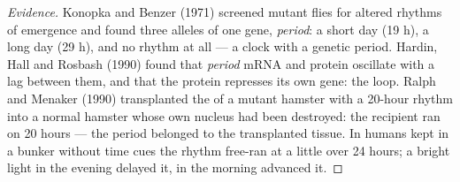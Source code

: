 \begin{proof}[Evidence]
Konopka and Benzer (1971) screened mutant flies for altered rhythms of
emergence and found three alleles of one gene, \emph{period}: a short
day (19 h), a long day (29 h), and no rhythm at all --- a clock with a
genetic period. Hardin, Hall and Rosbash (1990) found that
\emph{period} mRNA and protein oscillate with a lag between them, and
that the protein represses its own gene: the loop. Ralph and Menaker
(1990) transplanted the  of a mutant hamster with
a 20-hour rhythm into a normal hamster whose own nucleus had been
destroyed: the recipient ran on 20 hours --- the period belonged to the
transplanted tissue. In humans kept in a bunker without time cues the
rhythm free-ran at a little over 24 hours; a bright light in the
evening delayed it, in the morning advanced it.
\end{proof}

